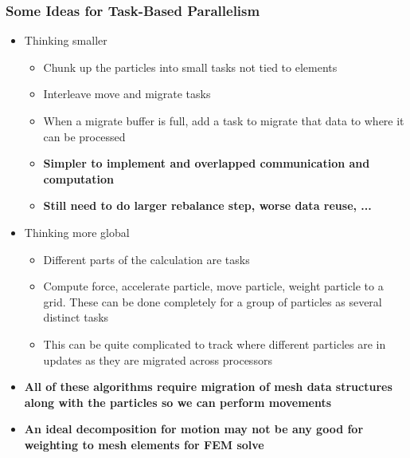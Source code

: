 \documentclass[t]{beamer}
\begin{document}
\begin{frame}
 \frametitle{Some Ideas for Task-Based Parallelism}
 \begin{itemize}
 \item Thinking smaller
   \begin{itemize}
     \item Chunk up the particles into small tasks not tied to
       elements 
     \item Interleave move and migrate tasks
     \item When a migrate buffer is full, add a task to migrate that
       data to where it can be processed
       \item \bf{Simpler to implement and overlapped communication and
           computation}
       \item \bf{Still need to do larger rebalance step, worse data
           reuse, ...}

   \end{itemize}
     
   \item Thinking more global
   \begin{itemize}
      \item Different parts of the calculation are tasks
        \item Compute force, accelerate particle, move particle,
          weight particle to a grid.  These can be done completely for
          a group of particles as several distinct tasks
        \item This can be quite complicated to track where different
          particles are in updates as they are migrated across
          processors


 \end{itemize}
 \item \bf{All of these algorithms require migration of mesh data
     structures along with the particles so we can perform movements}
 \item \bf{An ideal decomposition for motion may not be any good for
     weighting to mesh elements for FEM solve}
 \end{itemize}


\end{frame}

\fi
\end{document}
